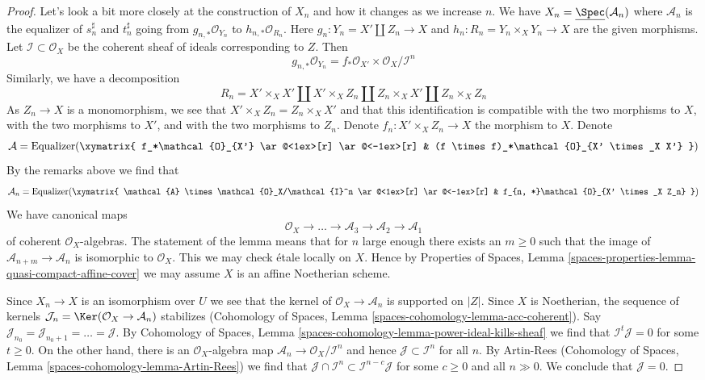 \begin{proof}
Let's look a bit more closely at the construction of $X_n$
and how it changes as we increase $n$. We have
$X_n = \underline{\Spec}(\mathcal{A}_n)$
where $\mathcal{A}_n$ is the equalizer of $s_n^\sharp$ and $t_n^\sharp$
going from $g_{n , *}\mathcal{O}_{Y_n}$ to $h_{n, *}\mathcal{O}_{R_n}$.
Here $g_n : Y_n = X' \amalg Z_n \to X$ and $h_n : R_n = Y_n \times_X Y_n \to X$
are the given morphisms. Let $\mathcal{I} \subset \mathcal{O}_X$ be the
coherent sheaf of ideals corresponding to $Z$. Then
$$
g_{n, *}\mathcal{O}_{Y_n} =
f_*\mathcal{O}_{X'} \times \mathcal{O}_X/\mathcal{I}^n
$$
Similarly, we have a decomposition
$$
R_n = X' \times_X X' \amalg X' \times_X Z_n \amalg
Z_n \times_X X' \amalg Z_n \times_X Z_n
$$
As $Z_n \to X$ is a monomorphism, we see that
$X' \times_X Z_n = Z_n \times_X X'$ and that this identification
is compatible with the two morphisms to $X$, with the two morphisms to
$X'$, and with the two morphisms to $Z_n$.
Denote $f_n : X' \times_X Z_n \to X$ the morphism to $X$.
Denote
$$
\mathcal{A} = \text{Equalizer}(
\xymatrix{
f_*\mathcal{O}_{X'} \ar@<1ex>[r] \ar@<-1ex>[r] &
(f \times f)_*\mathcal{O}_{X' \times_X X'}
}
)
$$
By the remarks above we find that
$$
\mathcal{A}_n =
\text{Equalizer}(
\xymatrix{
\mathcal{A} \times \mathcal{O}_X/\mathcal{I}^n \ar@<1ex>[r] \ar@<-1ex>[r] &
f_{n, *}\mathcal{O}_{X' \times_X Z_n}
}
)
$$
We have canonical maps
$$
\mathcal{O}_X \to \ldots \to \mathcal{A}_3 \to \mathcal{A}_2 \to \mathcal{A}_1
$$
of coherent $\mathcal{O}_X$-algebras. The statement of the lemma means that
for $n$ large enough there exists an $m \geq 0$ such that the image of
$\mathcal{A}_{n + m} \to \mathcal{A}_n$ is isomorphic to $\mathcal{O}_X$.
This we may check \'etale locally on $X$. Hence by Properties of Spaces,
Lemma \ref{spaces-properties-lemma-quasi-compact-affine-cover}
we may assume $X$ is an affine Noetherian scheme.

\medskip\noindent
Since $X_n \to X$ is an isomorphism over $U$ we see that the kernel
of $\mathcal{O}_X \to \mathcal{A}_n$ is supported on $|Z|$.
Since $X$ is Noetherian, the sequence of kernels
$\mathcal{J}_n = \Ker(\mathcal{O}_X \to \mathcal{A}_n)$ stabilizes
(Cohomology of Spaces, Lemma \ref{spaces-cohomology-lemma-acc-coherent}).
Say $\mathcal{J}_{n_0} = \mathcal{J}_{n_0 + 1} = \ldots = \mathcal{J}$.
By Cohomology of Spaces, Lemma
\ref{spaces-cohomology-lemma-power-ideal-kills-sheaf}
we find that $\mathcal{I}^t \mathcal{J} = 0$ for some $t \geq 0$.
On the other hand, there is an $\mathcal{O}_X$-algebra map
$\mathcal{A}_n \to \mathcal{O}_X/\mathcal{I}^n$
and hence $\mathcal{J} \subset \mathcal{I}^n$ for all $n$.
By Artin-Rees (Cohomology of Spaces, Lemma
\ref{spaces-cohomology-lemma-Artin-Rees}) we find that
$\mathcal{J} \cap \mathcal{I}^n \subset \mathcal{I}^{n - c}\mathcal{J}$
for some $c  \geq 0$ and all $n \gg 0$. We conclude that $\mathcal{J} = 0$.


\end{proof}
